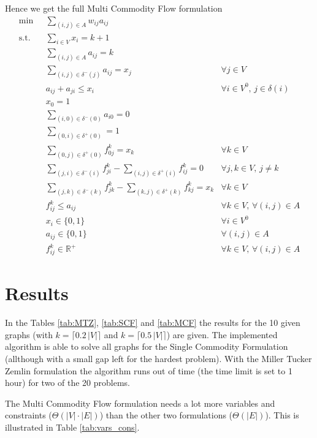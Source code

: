 \documentclass{article}
\newcommand{\R}{\mathbb{R}}
\begin{document}
	\newpage
	Hence we get the full Multi Commodity Flow formulation
	\begin{align*}
		\min & \sum_{(i,j) \in A} w_{ij} a_{ij} 	\\
		\text{s.t.} \quad & \sum_{i \in V} x_i = k+1  \\
		& \sum_{(i,j) \in A} a_{ij} = k \\ 
		& \sum_{(i,j) \in \delta^-(j)} a_{ij} = x_j & \forall j \in V  \\	
		& a_{ij} + a_{ji} \leq x_i & \forall i \in V^0, \, j \in \delta(i)  \\
		& x_0 = 1 \\
		& \sum_{(i,0) \in \delta^-(0)} a_{i0} = 0	\\
		& \sum_{(0,i) \in \delta^+(0)} = 1 \\
		& \sum_{(0,j) \in \delta^+(0)} f_{0j}^k = x_k & \forall k \in V \\
		& \sum_{(j,i) \in \delta^-(i)} f_{ji}^k - \sum_{(i,j) \in \delta^+(i)} f_{ij}^k = 0 & \forall j,k \in V, \, j \neq k  \\
		& \sum_{(j,k) \in \delta^-(k)} f_{jk}^k - \sum_{(k,j) \in \delta^+(k)} f_{kj}^k = x_k & \forall k \in V   \\
		& f_{ij}^k \leq a_{ij} & \forall k \in V, \, \forall (i,j) \in A  \\
		& x_i \in \lbrace 0,1 \rbrace & \forall i \in V^0  \\
		& a_{ij} \in \lbrace 0,1 \rbrace & \forall (i,j) \in A \\
		& f_{ij}^k \in \R^+ & \forall k \in V, \, \forall (i,j) \in A 
	\end{align*}
	
	\newpage
	\section{Results}	
	
	In the Tables \ref{tab:MTZ}, \ref{tab:SCF} and \ref{tab:MCF} the results for the 10 given graphs (with $k = \lceil 0.2 \, \lvert V \rvert \rceil $ and $k = \lceil 0.5 \, \lvert V \rvert \rceil$) are given. The implemented algorithm is able to solve all graphs for the Single Commodity Formulation (allthough with a small gap left for the hardest problem). With the Miller Tucker Zemlin formulation the algorithm runs out of time (the time limit is set to 1 hour) for two of the 20 problems.
	
	The Multi Commodity Flow formulation needs a lot more variables and constraints ($\Theta ( \lvert V \rvert \cdot \lvert E \rvert )$) than the other two formulations ($\Theta ( \lvert E \rvert ) $). This is illustrated in Table \ref{tab:vars_cons}. 
	
\end{document}
